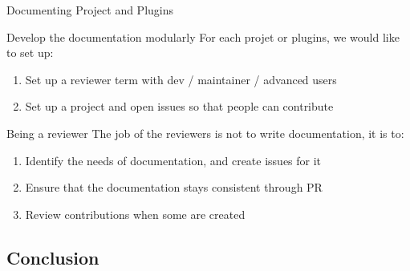 \documentclass[10pt]{beamer}
\begin{document}
\begin{frame}{Documenting Project and Plugins}
  \begin{tcbProp}{Develop the documentation modularly}
    For each projet or plugins, we would like to set up:
    \begin{enumerate}
      \item<2-> Set up a reviewer term with dev / maintainer / advanced users
      \item<2-> Set up a project and open issues so that people can contribute
    \end{enumerate}
  \end{tcbProp}
  \begin{tcbProp}{Being a reviewer}
    The job of the reviewers is not to write documentation, it is to:
    \begin{enumerate}
      \item<4-> Identify the needs of documentation, and create issues for it
      \item<5-> Ensure that the documentation stays consistent through PR
      \item<6-> Review contributions when some are created
    \end{enumerate}
  \end{tcbProp}
\end{frame}

\subsection{Conclusion}
\end{document}
